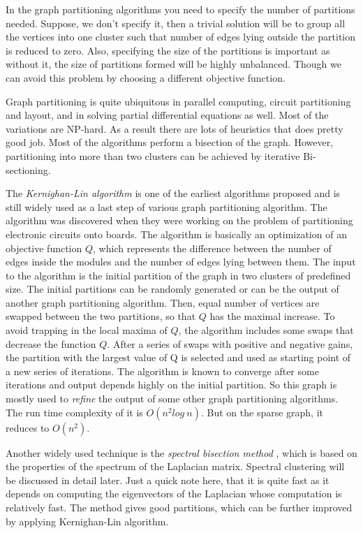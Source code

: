 \documentclass[letterpaper]{article}
\begin{document}
In the graph partitioning algorithms you need to specify the number of
partitions needed. Suppose, we don't specify it, then a trivial solution will
be to group all the vertices into one cluster such that number of edges lying
outside the partition is reduced to zero.  Also, specifying the size of the
partitions is important as without it, the size of partitions formed will be
highly unbalanced. Though we can avoid this problem by choosing a different
objective function.

Graph partitioning is quite ubiquitous in parallel computing, circuit
partitioning and layout, and in solving partial differential equations as well.
Most of the variations are NP-hard. As a result there are lots of heuristics
that does pretty good job. Most of the algorithms perform a bisection of the
graph. However, partitioning into more than two clusters can be achieved by
iterative Bi-sectioning. 

The \emph{Kernighan-Lin algorithm} \cite{kerni70} is one of the earliest
algorithms proposed and is still widely used as a last step of various graph
partitioning algorithm. The algorithm was discovered when they were working on
the problem of partitioning electronic circuits onto boards. The algorithm is
basically an optimization of an objective function $Q$, which represents the
difference between the number of edges inside the modules and the number of
edges lying between them.  The input to the algorithm is the initial partition
of the graph in two clusters of predefined size.  The initial partitions can be
randomly generated or can be the output of another graph partitioning
algorithm. Then, equal number of vertices are swapped between the two
partitions, so that $Q$ has the maximal increase. To avoid trapping in the
local maxima of $Q$, the algorithm includes some swaps that decrease the
function $Q$. After a series of swaps with positive and negative gains, the
partition with the largest value of Q is selected and used as starting point of
a new series of iterations.  The algorithm is known to converge after some
iterations and output depends highly on the initial partition.  So this graph
is mostly used to \emph{refine} the output of some other graph partitioning
algorithms. The run time complexity of it is $O(n^2 log\ n)$. But on the sparse
graph, it reduces to $O(n^2)$. 

Another widely used technique is the \emph{spectral bisection method}
\cite{barnes82}, which is based on the properties of the spectrum of the
Laplacian matrix. Spectral clustering will be discussed in detail later.  Just
a quick note here, that it is quite fast as it depends on computing the
eigenvectors of the Laplacian whose computation is relatively fast. The method
gives good partitions, which can be further improved by applying Kernighan-Lin
algorithm.
\end{document}
